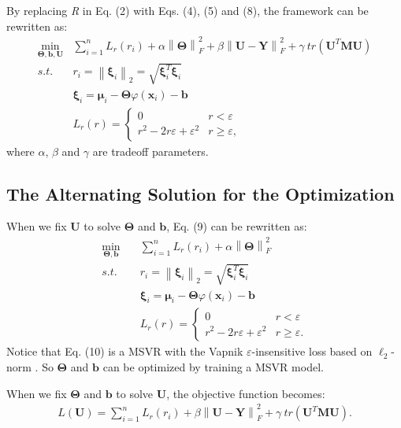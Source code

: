 \documentclass[conference]{IEEEtran}
\begin{document}
By replacing \emph{R} in Eq. (2) with Eqs. (4), (5) and (8), the framework can be rewritten as:
\begin{equation}
\begin{split}
\mathop {\min }\limits_{\bm{\Theta}, \bm{b}, \bm{U}}&\sum_{i=1}^nL_r(r_i) + \alpha\left\lVert \bm{\Theta} \right\rVert_F^2 + \beta \left\lVert \bm{U} - \bm{Y} \right\rVert_F^2 + \gamma \ tr(\bm{U}^T\bm{M}\bm{U})\\
s.t.\quad&r_i=\left\lVert \bm{\xi}_i \right\rVert_2=\sqrt{\bm{\xi}_i^T\bm{\xi}_i}\\
&\bm{\xi}_i=\bm{\mu}_i-\bm{\Theta}\varphi(\bm{x}_i)-\bm{b}\\
&L_r(r)=
\left\{
     \begin{array}{lr}
     0 &r<\varepsilon\\
     r^2-2r\varepsilon+\varepsilon^2 &r \geq \varepsilon,
     \end{array}
\right.
\end{split}
\end{equation}
where $\alpha$, $\beta$ and $\gamma$ are tradeoff parameters.

\subsection{The Alternating Solution for the Optimization}
When we fix $\bm{U}$ to solve $\bm{\Theta}$ and $\bm{b}$, Eq. (9) can be rewritten as:
\begin{equation}
\begin{split}
\mathop {\min }\limits_{\bm{\Theta}, \bm{b}}\quad&\sum_{i=1}^nL_r(r_i) + \alpha\left\lVert \bm{\Theta} \right\rVert_F^2\\
s.t.\quad&r_i=\left\lVert \bm{\xi}_i \right\rVert_2=\sqrt{\bm{\xi}_i^T\bm{\xi}_i}\\
&\bm{\xi}_i=\bm{\mu}_i-\bm{\Theta}\varphi(\bm{x}_i)-\bm{b}\\
&L_r(r)=
\left\{
     \begin{array}{lr}
     0&r<\varepsilon\\
     r^2-2r\varepsilon+\varepsilon^2 &r \geq \varepsilon.
     \end{array}
\right.
\end{split}
\end{equation}
Notice that Eq. (10) is a MSVR with the Vapnik $\varepsilon$-insensitive loss based on $\ell_2$-norm \cite{tuia2011multioutput}. So $\bm{\Theta}$ and $\bm{b}$ can be optimized by training a MSVR model.

When we fix $\bm{\Theta}$ and $\bm{b}$ to solve $\bm{U}$, the objective function becomes:
\begin{equation}
\begin{split}
L(\bm{U})=\sum_{i=1}^nL_r(r_i) + \beta \left\lVert \bm{U} - \bm{Y} \right\rVert_F^2 + \gamma \ tr(\bm{U}^T\bm{M}\bm{U}).\\
\end{split}
\end{equation}
\end{document}

